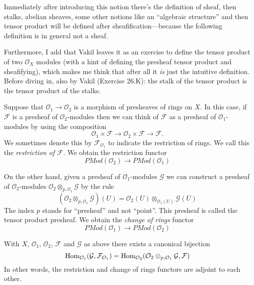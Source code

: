 Immediately after introducing this notion there's the definition of sheaf, then
stalks, abelian sheaves, some other notions like an ``algebraic structure'' and
then tensor product will be defined after sheafification---because the following
definition is in general not a sheaf.

Furthermore, I add that Vakil leaves it as an exercise to define the tensor
product of two $\mathcal{O}_X$ modules (with a hint of defining the presheaf
tensor product and sheafifying), which makes me think that after all it {\it is}
just the intuitive definition. Before diving in, also by Vakil (Exercise 26.K):
the stalk of the tensor product is the tensor product of the stalks.

\medskip\noindent

Suppose that $\mathcal{O}_1 \to \mathcal{O}_2$ is a
morphism of presheaves of rings on $X$. In this case,
if $\mathcal{F}$ is a presheaf of $\mathcal{O}_2$-modules
then we can think of $\mathcal{F}$ as a presheaf of
$\mathcal{O}_1$-modules by using the composition
$$
\mathcal{O}_1 \times \mathcal{F}
\to
\mathcal{O}_2 \times \mathcal{F}
\to
\mathcal{F}.
$$
We sometimes denote this by $\mathcal{F}_{\mathcal{O}_1}$
to indicate the restriction of rings. We call this
the {\it restriction of $\mathcal{F}$}. We obtain the
restriction functor
$$
\textit{PMod}(\mathcal{O}_2)
\longrightarrow
\textit{PMod}(\mathcal{O}_1)
$$

\medskip\noindent
On the other hand, given a presheaf of $\mathcal{O}_1$-modules
$\mathcal{G}$
we can construct a presheaf of $\mathcal{O}_2$-modules
$\mathcal{O}_2 \otimes_{p, \mathcal{O}_1} \mathcal{G}$
by the rule
$$
\left(\mathcal{O}_2 \otimes_{p, \mathcal{O}_1} \mathcal{G}\right)(U)
=
\mathcal{O}_2(U) \otimes_{\mathcal{O}_1(U)} \mathcal{G}(U)
$$
The index $p$ stands for ``presheaf'' and not ``point''.
This presheaf is called the tensor product presheaf. We obtain
the {\it change of rings} functor
$$
\textit{PMod}(\mathcal{O}_1)
\longrightarrow
\textit{PMod}(\mathcal{O}_2)
$$

\begin{lemma}
\label{lemma-adjointness-tensor-restrict-presheaves}
With $X$, $\mathcal{O}_1$, $\mathcal{O}_2$, $\mathcal{F}$ and
$\mathcal{G}$ as above there exists a canonical bijection
$$
\mathop{\mathrm{Hom}}\nolimits_{\mathcal{O}_1}(\mathcal{G}, \mathcal{F}_{\mathcal{O}_1})
=
\mathop{\mathrm{Hom}}\nolimits_{\mathcal{O}_2}(
\mathcal{O}_2 \otimes_{p, \mathcal{O}_1} \mathcal{G},
\mathcal{F}
)
$$
In other words, the restriction and change of rings functors
are adjoint to each other.
\end{lemma}

